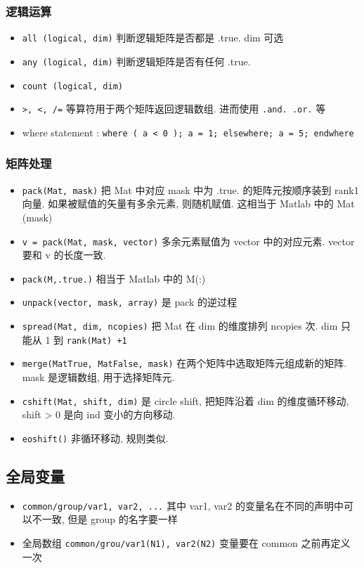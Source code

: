 \subsubsection{逻辑运算}
\begin{itemize}
\item \verb`all (logical, dim)` 判断逻辑矩阵是否都是 .true.  dim 可选
\item \verb`any (logical, dim)` 判断逻辑矩阵是否有任何 .true.
\item \verb`count (logical, dim) `
\item \verb`>, <, /=` 等算符用于两个矩阵返回逻辑数组. 进而使用 \verb`.and. .or.` 等
\item where statement : 
\verb`where ( a < 0 ); a = 1; elsewhere; a = 5; endwhere`
\end{itemize}

\subsubsection{矩阵处理}
\begin{itemize}
\item \verb`pack(Mat, mask)` 把 Mat 中对应 mask 中为 .true. 的矩阵元按顺序装到 rank1 向量. 如果被赋值的矢量有多余元素, 则随机赋值. 这相当于 Matlab 中的 Mat (mask)
\item \verb`v = pack(Mat, mask, vector)` 多余元素赋值为 vector 中的对应元素. vector 要和 v 的长度一致.
\item \verb`pack(M,.true.)` 相当于 Matlab 中的 M(:)
\item \verb`unpack(vector, mask, array)` 是 pack 的逆过程
\item \verb`spread(Mat, dim, ncopies)` 把 Mat 在 dim 的维度排列 ncopies 次. dim 只能从 1 到 \verb`rank(Mat) +1`
\item \verb`merge(MatTrue, MatFalse, mask)` 在两个矩阵中选取矩阵元组成新的矩阵. mask 是逻辑数组, 用于选择矩阵元.
\item \verb`cshift(Mat, shift, dim)` 是 circle shift, 把矩阵沿着 dim 的维度循环移动, shift > 0 是向 ind 变小的方向移动.
\item \verb`eoshift()` 非循环移动, 规则类似.
\end{itemize}

\subsection{全局变量}
\begin{itemize}
\item \verb`common/group/var1, var2, ...` 其中 var1, var2 的变量名在不同的声明中可以不一致, 但是 group 的名字要一样
\item 全局数组 \verb`common/grou/var1(N1), var2(N2)` 变量要在 common 之前再定义一次
\end{itemize}

